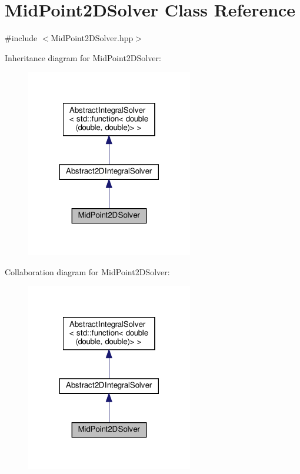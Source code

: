 \hypertarget{class_mid_point2_d_solver}{}\section{Mid\+Point2\+D\+Solver Class Reference}
\label{class_mid_point2_d_solver}


{\ttfamily \#include $<$Mid\+Point2\+D\+Solver.\+hpp$>$}



Inheritance diagram for Mid\+Point2\+D\+Solver\+:
\nopagebreak
\begin{figure}[H]
\begin{center}
\leavevmode
\includegraphics[width=206pt]{class_mid_point2_d_solver__inherit__graph}
\end{center}
\end{figure}


Collaboration diagram for Mid\+Point2\+D\+Solver\+:
\nopagebreak
\begin{figure}[H]
\begin{center}
\leavevmode
\includegraphics[width=206pt]{class_mid_point2_d_solver__coll__graph}
\end{center}
\end{figure}
